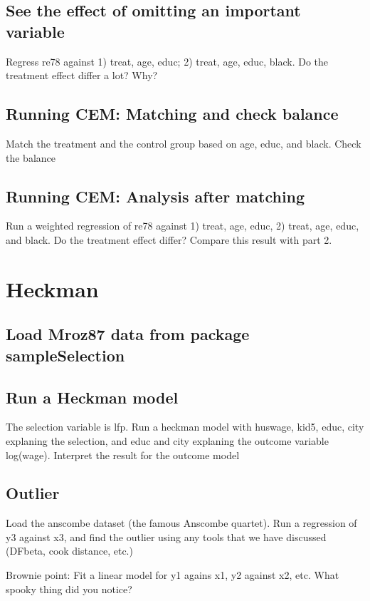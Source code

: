 \documentclass{article}\usepackage[]{graphicx}\usepackage[]{color}
\begin{document}
\subsection{See the effect of omitting an important variable}

Regress re78 against 1) treat, age, educ; 2) treat, age, educ, black. Do the treatment effect differ a lot? Why?

\subsection{Running CEM: Matching and check balance}

Match the treatment and the control group based on age, educ, and black. Check the balance

\subsection{Running CEM: Analysis after matching}

Run a weighted regression of re78 against 1) treat, age, educ, 2) treat, age, educ, and black. Do the treatment effect differ? Compare this result with part 2.

\section{Heckman}

\subsection{Load Mroz87 data from package sampleSelection}

\subsection{Run a Heckman model}

The selection variable is lfp. Run a heckman model with huswage, kid5, educ, city explaning the selection, and educ and city explaning the outcome variable log(wage). Interpret the result for the outcome model

\subsection{Outlier}

Load the anscombe dataset (the famous Anscombe quartet). Run a regression of y3 against x3, and find the outlier using any tools that we have discussed (DFbeta, cook distance, etc.)

Brownie point: Fit a linear model for y1 agains x1, y2 against x2, etc. What spooky thing did you notice?
\end{document}
